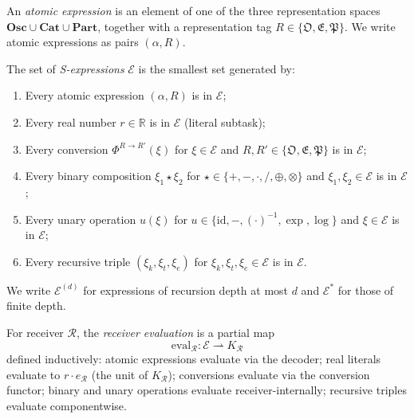 \begin{definition}\label{def:atomic-mono}
An \emph{atomic expression} is an element of one of the three representation
spaces $\mathbf{Osc} \cup \mathbf{Cat} \cup \mathbf{Part}$, together with a
representation tag $R \in \{\mathfrak{O}, \mathfrak{E}, \mathfrak{P}\}$.
We write atomic expressions as pairs $(\alpha, R)$.
\end{definition}

\begin{definition}[S-expression]\label{def:s-expression-mono}
The set of \emph{S-expressions} $\mathcal{E}$ is the smallest set generated
by:
\begin{enumerate}[(1)]
  \item Every atomic expression $(\alpha, R)$ is in $\mathcal{E}$;
  \item Every real number $r \in \mathbb{R}$ is in $\mathcal{E}$
    (literal subtask);
  \item Every conversion $\Phi^{R \to R'}(\xi)$ for $\xi \in \mathcal{E}$
    and $R, R' \in \{\mathfrak{O}, \mathfrak{E}, \mathfrak{P}\}$ is in
    $\mathcal{E}$;
  \item Every binary composition $\xi_1 \star \xi_2$ for
    $\star \in \{+, -, \cdot, /, \oplus, \otimes\}$ and
    $\xi_1, \xi_2 \in \mathcal{E}$ is in $\mathcal{E}$;
  \item Every unary operation $u(\xi)$ for
    $u \in \{\mathrm{id}, -, (\cdot)^{-1}, \exp, \log\}$ and
    $\xi \in \mathcal{E}$ is in $\mathcal{E}$;
  \item Every recursive triple $(\xi_k, \xi_t, \xi_e)$ for
    $\xi_k, \xi_t, \xi_e \in \mathcal{E}$ is in $\mathcal{E}$.
\end{enumerate}
We write $\mathcal{E}^{(d)}$ for expressions of recursion depth at most $d$
and $\mathcal{E}^{*}$ for those of finite depth.
\end{definition}

\begin{definition}\label{def:eval-mono}
For receiver $\mathcal{R}$, the \emph{receiver evaluation} is a partial map
\[
  \mathrm{eval}_{\mathcal{R}} : \mathcal{E} \rightharpoonup K_{\mathcal{R}}
\]
defined inductively: atomic expressions evaluate via the decoder; real literals
evaluate to $r \cdot e_{\mathcal{R}}$ (the unit of $K_{\mathcal{R}}$);
conversions evaluate via the conversion functor; binary and unary operations
evaluate receiver-internally; recursive triples evaluate componentwise.
\end{definition}

